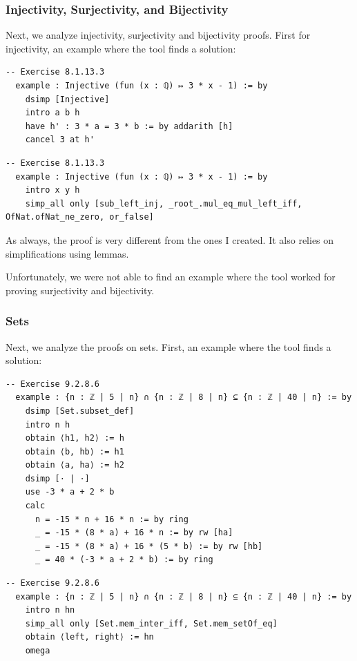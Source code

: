 \documentclass[12pt]{article}
\newcommand{\leancopilot}{\texttt{LeanCopilot} }
\begin{document}
\subsubsection{Injectivity, Surjectivity, and Bijectivity}
Next, we analyze injectivity, surjectivity and bijectivity proofs. First for injectivity, an example where the tool finds a solution:

\begin{minipage}{0.495\textwidth}
  \begin{lstlisting}[title={Human proof}]
  -- Exercise 8.1.13.3    
  example : Injective (fun (x : ℚ) ↦ 3 * x - 1) := by
    dsimp [Injective]
    intro a b h
    have h' : 3 * a = 3 * b := by addarith [h]
    cancel 3 at h'
  \end{lstlisting}
\end{minipage}
\vline
\begin{minipage}{0.495\textwidth}
  \begin{lstlisting}[title={\leancopilot proof}]
  -- Exercise 8.1.13.3 
  example : Injective (fun (x : ℚ) ↦ 3 * x - 1) := by
    intro x y h
    simp_all only [sub_left_inj, _root_.mul_eq_mul_left_iff, OfNat.ofNat_ne_zero, or_false]
  \end{lstlisting}
\end{minipage}

As always, the proof is very different from the ones I created. It also relies on simplifications using lemmas.

Unfortunately, we were not able to find an example where the tool worked for proving surjectivity and bijectivity. 

\subsubsection{Sets}
Next, we analyze the proofs on sets. First, an example where the tool finds a solution:

\begin{minipage}{0.495\textwidth}
  \begin{lstlisting}[title={Human proof}]
  -- Exercise 9.2.8.6   
  example : {n : ℤ | 5 | n} ∩ {n : ℤ | 8 | n} ⊆ {n : ℤ | 40 | n} := by
    dsimp [Set.subset_def]
    intro n h
    obtain ⟨h1, h2⟩ := h
    obtain ⟨b, hb⟩ := h1
    obtain ⟨a, ha⟩ := h2
    dsimp [· | ·]
    use -3 * a + 2 * b
    calc
      n = -15 * n + 16 * n := by ring
      _ = -15 * (8 * a) + 16 * n := by rw [ha]
      _ = -15 * (8 * a) + 16 * (5 * b) := by rw [hb]
      _ = 40 * (-3 * a + 2 * b) := by ring
  \end{lstlisting}
\end{minipage}
\vline
\begin{minipage}{0.495\textwidth}
  \begin{lstlisting}[title={\leancopilot proof}]
  -- Exercise 9.2.8.6   
  example : {n : ℤ | 5 | n} ∩ {n : ℤ | 8 | n} ⊆ {n : ℤ | 40 | n} := by
    intro n hn
    simp_all only [Set.mem_inter_iff, Set.mem_setOf_eq]
    obtain ⟨left, right⟩ := hn
    omega
  \end{lstlisting}
\end{minipage}
\end{document}
